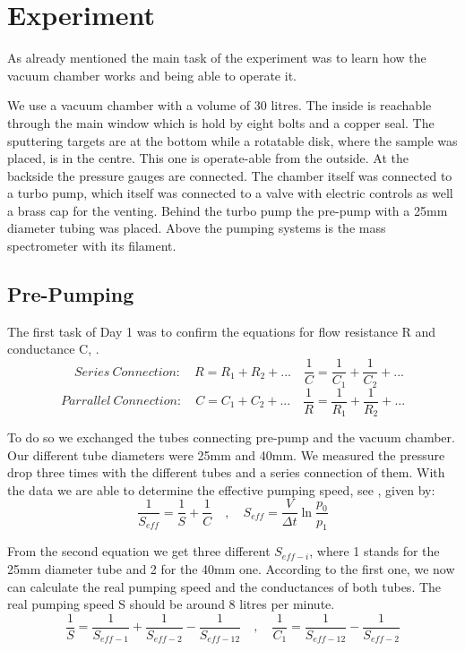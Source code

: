 \documentclass[]{article}
\begin{document}
\newpage
\section{Experiment}
As already mentioned the main task of the experiment was to learn how the vacuum chamber works and being able to operate it. 

We use a vacuum chamber with a volume of 30 litres. The inside is reachable through the main window which is hold by eight bolts and a copper seal. The sputtering targets are at the bottom while a rotatable disk, where the sample was placed, is in the centre. This one is operate-able from the outside. At the backside the pressure gauges are connected. 
The chamber itself was connected to a turbo pump, which itself was connected to a valve with electric controls as well a brass cap for the venting. Behind the turbo pump the pre-pump with a 25mm diameter tubing was placed. Above the pumping systems is the mass spectrometer with its filament.

\subsection{Pre-Pumping}
The first task of Day 1 was to confirm the equations for flow resistance R and conductance C, \cite[Page 91]{VacuumHandbook}. 
\[ \quad Series \: Connection: \quad
R = R_1 + R_2 + ...  \quad \frac{1}{C} = \frac{1}{C_1} + \frac{1}{C_2} + ... \]
\[ Parrallel \: Connection: \quad
C = C_1 + C_2 + ...  \quad \frac{1}{R} = \frac{1}{R_1} + \frac{1}{R_2} + ... \]

To do so we exchanged the tubes connecting pre-pump and the vacuum chamber. Our different tube diameters were 25mm and 40mm. We measured the pressure drop three times with the different tubes and a series connection of them. With the data we are able to determine the effective pumping speed, see \cite[Page 93]{VacuumHandbook}, given by:
\[ \frac{1}{S_{eff}} = \frac{1}{S} + \frac{1}{C} \quad , \quad
S_{eff} = \frac{V}{\Delta t} \ln{ \frac{p_0}{p_1} } \]

From the second equation we get three different $S_{eff-i}$, where 1 stands for the 25mm diameter tube and 2 for the 40mm one. According to the first one, we now can calculate the real pumping speed and the conductances of both tubes. The real pumping speed S should be around 8 litres per minute.
\[ \frac{1}{S} = \frac{1}{S_{eff-1}} + \frac{1}{S_{eff-2}} -\frac{1}{S_{eff-12}} \quad , \quad
\frac{1}{C_1} = \frac{1}{S_{eff-12}} - \frac{1}{S_{eff-2}} \]
\end{document}
